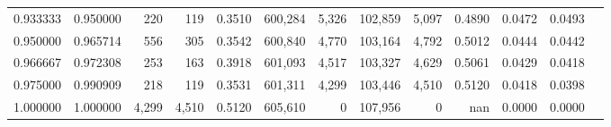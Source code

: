 \begin{tabular}{rrrrrrrrrrrrr}
0.933333 & 0.950000 &    220 &    119 &                                     0.3510 & 600,284 &   5,326 & 102,859 &   5,097 & 0.4890 & 0.0472 & 0.0493 \\
0.950000 & 0.965714 &    556 &    305 &                                     0.3542 & 600,840 &   4,770 & 103,164 &   4,792 & 0.5012 & 0.0444 & 0.0442 \\
0.966667 & 0.972308 &    253 &    163 &                                     0.3918 & 601,093 &   4,517 & 103,327 &   4,629 & 0.5061 & 0.0429 & 0.0418 \\
0.975000 & 0.990909 &    218 &    119 &                                     0.3531 & 601,311 &   4,299 & 103,446 &   4,510 & 0.5120 & 0.0418 & 0.0398 \\
1.000000 & 1.000000 &  4,299 &  4,510 &                                     0.5120 & 605,610 &       0 & 107,956 &       0 &    nan & 0.0000 & 0.0000 \\
\bottomrule
\end{tabular}
